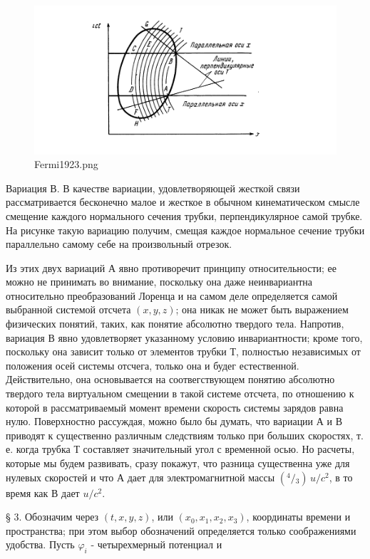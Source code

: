 \documentclass[11pt]{article}
\begin{document}
    \begin{figure}
\centering
\includegraphics{Fermi1923.png}
\caption{Fermi1923.png}
\end{figure}

    Вариация В. В качестве вариации, удовлетворяющей жесткой связи
рассматривается бесконечно малое и жесткое в обычном кинематическом
смысле смещение каждого нормального сечения трубки, перпендикулярное
самой трубке. На рисунке такую вариацию получим, смещая каждое
нормальное сечение трубки параллельно самому себе на произвольный
отрезок.

    Из этих двух вариаций А явно противоречит принципу относительности; ее
можно не принимать во внимание, поскольку она даже неинвариантна
относительно преобразований Лоренца и на самом деле определяется самой
выбранной системой отсчета \((x, y, z)\); она никак не может быть
выражением физических понятий, таких, как понятие абсолютно твердого
тела. Напротив, вариация В явно удовлетворяет указанному условию
инвариантности; кроме того, поскольку она зависит только от элементов
трубки Т, полностью независимых от положения осей системы отсчега,
только она и будег естественной. Действительно, она основывается на
соотвегствующем понятию абсолютно твердого тела виртуальном смещении в
такой системе отсчета, по отношению к которой в рассматриваемый момент
времени скорость системы зарядов равна нулю. Поверхностно рассуждая,
можно было бы думать, что вариации А и В приводят к существенно
различным следствиям только при больших скоростях, т. е. когда трубка Т
составляет значительный угол с временной осью. Но расчеты, которые мы
будем развивать, сразу покажут, что разница существенна уже для нулевых
скоростей и что А дает для электромагнитной массы
\(\left({}^{4} \big /{}_{3}\right) \, u/c^2\), в то время как В дает
\(u/c^2\).

    § 3. Обозначим через \((t, x, y, z)\), или \((x_0, x_1, x_2, x_3)\),
координаты времени и пространства; при этом выбор обозначений
определяется только соображениями удобства. Пусть \(\varphi_i\) -
четырехмерный потенциал и
\end{document}

